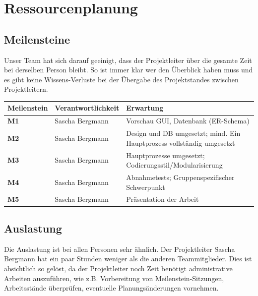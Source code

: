 \section{Ressourcenplanung}
\subsection{Meilensteine}
Unser Team hat sich darauf geeinigt, dass der Projektleiter über die gesamte Zeit bei derselben Person bleibt.
So ist immer klar wer den Überblick haben muss und es gibt keine Wissens-Verluste bei der Übergabe des Projektstandes zwischen Projektleitern. 

\begin{tabularx}{\textwidth-2cm}{|l|l|X|} \hline
\textbf{Meilenstein}	& \textbf{Verantwortlichkeit} &	\textbf{Erwartung} \\ \hline
\textbf{M1}	&Sascha Bergmann	&Vorschau GUI, Datenbank (ER-Schema) \\  \hline
\textbf{M2}	&Sascha Bergmann	&Design und DB umgesetzt; mind. Ein Hauptprozess vollständig umgesetzt \\ \hline
\textbf{M3}	&Sascha Bergmann	&Hauptprozesse umgesetzt; Codierungsstil/Modularisierung \\ \hline
\textbf{M4}	&Sascha Bergmann	&Abnahmetests; Gruppenspezifischer Schwerpunkt \\ \hline
\textbf{M5}	&Sascha Bergmann	&Präsentation der Arbeit \\ \hline
\end{tabularx}

\subsection{Auslastung}
Die Auslastung ist bei allen Personen sehr ähnlich. Der Projektleiter Sascha Bergmann hat ein paar Stunden weniger als die anderen Teammitglieder. Dies ist absichtlich so gelöst, da der Projektleiter noch Zeit benötigt administrative Arbeiten auszuführen, wie z.B. Vorbereitung von Meilenstein-Sitzungen, Arbeitsstände überprüfen, eventuelle Planungsänderungen vornehmen.

